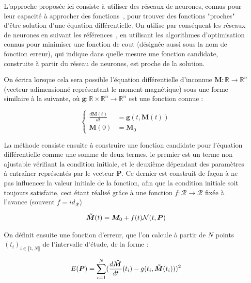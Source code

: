 \documentclass[12pt]{report}
\begin{document}
L'approche proposée ici consiste à utiliser des réseaux de neurones, connus pour leur capacité à approcher des fonctions~\cite{FunctionApproximation}, pour trouver des fonctions "proches" d'être solution d'une équation différentielle.
On utilise par conséquent les réseaux de neurones en suivant les références~\cite{MLWithApp,ANNforOPDEs,HighOrderHybrid}, en utilisant les algorithmes d'optimisation connus pour minimiser une fonction de cout (désignée aussi sous la nom de fonction erreur), qui indique dans quelle mesure une fonction candidate, construite à partir du réseau de neurones, est proche de la solution.

On écrira lorsque cela sera possible l'équation différentielle d'inconnue $\bm{M}: \mathbb{R} \to  \mathbb{R}^n$ (vecteur adimensionné représentant le moment magnétique) sous une forme similaire à la suivante, où $\bm{g}:  \mathbb{R}\times\mathbb{R}^n \to  \mathbb{R}^n$ est une fonction connue :

\begin{equation}
    \left\{
        \begin{aligned}
            \frac{d\bm{M}(t)}{dt} &= \bm{g}(t, \bm{M}(t)) \\
            \bm{M}(0) &= \bm{M}_0
        \end{aligned}
    \right.
\label{eq:equa_dif_example}
\end{equation}

La méthode consiste ensuite à construire une fonction candidate pour l'équation différentielle comme une somme de deux termes.
le premier est un terme non ajustable vérifiant la condition initiale, et le deuxième dépendant des paramètres à entraîner représentés par le vecteur $\bm{P}$. Ce dernier est construit de façon à ne pas influencer la valeur initiale de la fonction, afin que la condition initiale soit toujours satisfaite, ceci étant réalisé grâce à une fonction $f:\mathcal{R}\to\mathcal{R}$ fixée à l'avance (souvent $f = id_{\mathcal{R}}$)

\begin{equation}
    \bm{\Tilde{M}}(t) = \bm{M}_0 + f(t)\mathcal{N}(t,\bm{P}) 
\label{eq:solution_candidate_generique}
\end{equation}
    
On définit ensuite une fonction d'erreur, que l'on calcule à partir de $N$ points $(t_i)_{i\in \llbracket 1, N \rrbracket}$ de l'intervalle d'étude, de la forme :

\begin{equation}
    E ({\bm P})= \sum_{i=1}^{N} (\frac{d\bm{\Tilde{M}}}{dt}(t_i) -g(t_i, \bm{\Tilde{M}}(t_i)))^2   
\label{eq:fonction_erreur_generique}
\end{equation}
\end{document}
